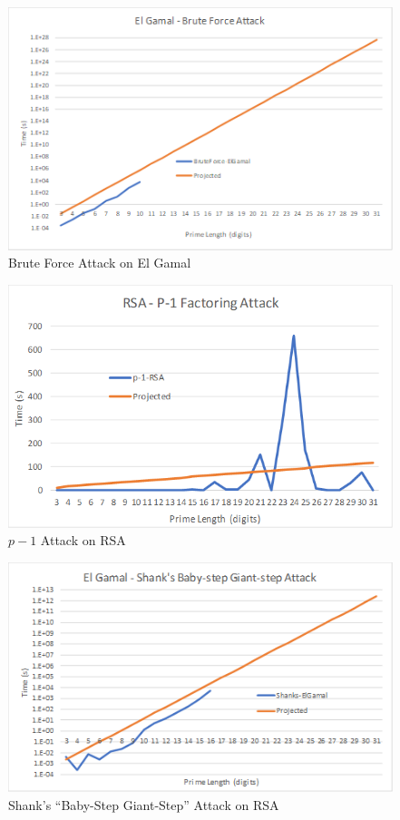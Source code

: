 \documentclass[12pt]{report}
\begin{document}
\begin{figure}[hp!] %
    \begin{center}
        \includegraphics[width=0.85\linewidth]{ElGamalBrute.PNG}
        \caption{Brute Force Attack on El Gamal}
        \label{fig:el-gamal1}
    \end{center}
\end{figure}

\begin{figure}[hp!] %
    \begin{center}
        \includegraphics[width=0.85\linewidth]{RSAp-1.PNG}
        \caption{$p-1$ Attack on RSA}
        \label{fig:rsa2}
    \end{center}
\end{figure}

\begin{figure}[hp!] %
    \begin{center}
        \includegraphics[width=0.85\linewidth]{ElGamalShanks.PNG}
        \caption{Shank's ``Baby-Step Giant-Step'' Attack on RSA}
        \label{fig:el-gamal2}
    \end{center}
\end{figure}
\end{document}
